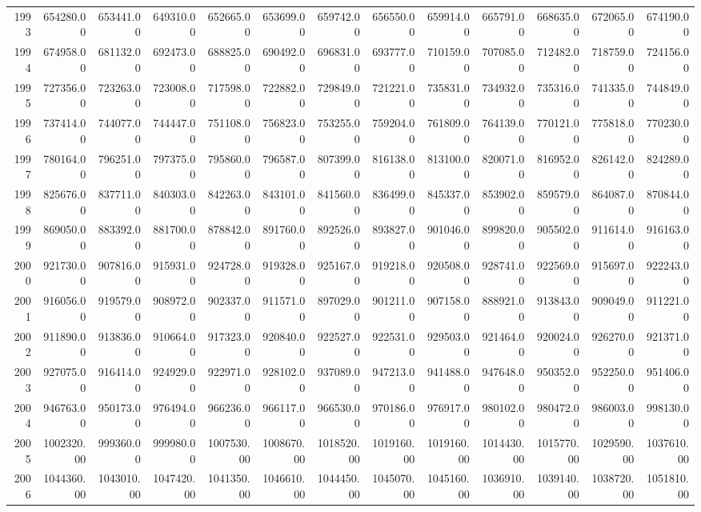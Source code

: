 \begin{longtable}{rrrrrrrrrrrrr}
  1993 & 654280.00 & 653441.00 & 649310.00 & 652665.00 & 653699.00 & 659742.00 & 656550.00 & 659914.00 & 665791.00 & 668635.00 & 672065.00 & 674190.00 \\ 
  1994 & 674958.00 & 681132.00 & 692473.00 & 688825.00 & 690492.00 & 696831.00 & 693777.00 & 710159.00 & 707085.00 & 712482.00 & 718759.00 & 724156.00 \\ 
  1995 & 727356.00 & 723263.00 & 723008.00 & 717598.00 & 722882.00 & 729849.00 & 721221.00 & 735831.00 & 734932.00 & 735316.00 & 741335.00 & 744849.00 \\ 
  1996 & 737414.00 & 744077.00 & 744447.00 & 751108.00 & 756823.00 & 753255.00 & 759204.00 & 761809.00 & 764139.00 & 770121.00 & 775818.00 & 770230.00 \\ 
  1997 & 780164.00 & 796251.00 & 797375.00 & 795860.00 & 796587.00 & 807399.00 & 816138.00 & 813100.00 & 820071.00 & 816952.00 & 826142.00 & 824289.00 \\ 
  1998 & 825676.00 & 837711.00 & 840303.00 & 842263.00 & 843101.00 & 841560.00 & 836499.00 & 845337.00 & 853902.00 & 859579.00 & 864087.00 & 870844.00 \\ 
  1999 & 869050.00 & 883392.00 & 881700.00 & 878842.00 & 891760.00 & 892526.00 & 893827.00 & 901046.00 & 899820.00 & 905502.00 & 911614.00 & 916163.00 \\ 
  2000 & 921730.00 & 907816.00 & 915931.00 & 924728.00 & 919328.00 & 925167.00 & 919218.00 & 920508.00 & 928741.00 & 922569.00 & 915697.00 & 922243.00 \\ 
  2001 & 916056.00 & 919579.00 & 908972.00 & 902337.00 & 911571.00 & 897029.00 & 901211.00 & 907158.00 & 888921.00 & 913843.00 & 909049.00 & 911221.00 \\ 
  2002 & 911890.00 & 913836.00 & 910664.00 & 917323.00 & 920840.00 & 922527.00 & 922531.00 & 929503.00 & 921464.00 & 920024.00 & 926270.00 & 921371.00 \\ 
  2003 & 927075.00 & 916414.00 & 924929.00 & 922971.00 & 928102.00 & 937089.00 & 947213.00 & 941488.00 & 947648.00 & 950352.00 & 952250.00 & 951406.00 \\ 
  2004 & 946763.00 & 950173.00 & 976494.00 & 966236.00 & 966117.00 & 966530.00 & 970186.00 & 976917.00 & 980102.00 & 980472.00 & 986003.00 & 998130.00 \\ 
  2005 & 1002320.00 & 999360.00 & 999980.00 & 1007530.00 & 1008670.00 & 1018520.00 & 1019160.00 & 1019160.00 & 1014430.00 & 1015770.00 & 1029590.00 & 1037610.00 \\ 
  2006 & 1044360.00 & 1043010.00 & 1047420.00 & 1041350.00 & 1046610.00 & 1044450.00 & 1045070.00 & 1045160.00 & 1036910.00 & 1039140.00 & 1038720.00 & 1051810.00 \\ 

\end{longtable}
